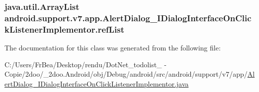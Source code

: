 \hypertarget{classandroid_1_1support_1_1v7_1_1app_1_1_alert_dialog___i_dialog_interface_on_click_listener_implementor_0702810770fa11a2d9339a06dd84e5e2}{
\subsubsection[{refList}]{\setlength{\rightskip}{0pt plus 5cm}java.util.ArrayList {\bf android.support.v7.app.AlertDialog\_\-IDialogInterfaceOnClickListenerImplementor.refList}}}
\label{classandroid_1_1support_1_1v7_1_1app_1_1_alert_dialog___i_dialog_interface_on_click_listener_implementor_0702810770fa11a2d9339a06dd84e5e2}




The documentation for this class was generated from the following file:\begin{CompactItemize}
\item 
C:/Users/FrBea/Desktop/rendu/DotNet\_\-todolist\_ - Copie/2doo/\_\-2doo.Android/obj/Debug/android/src/android/support/v7/app/\hyperlink{_alert_dialog___i_dialog_interface_on_click_listener_implementor_8java}{AlertDialog\_\-IDialogInterfaceOnClickListenerImplementor.java}\end{CompactItemize}
